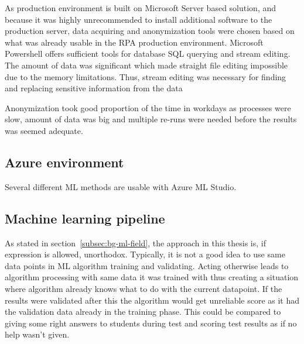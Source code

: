 As production environment is built on Microsoft Server based solution,
and because it was highly unrecommended
to install additional software to the production server,
data acquiring and anonymization tools were chosen
based on what was already usable in the RPA production environment.
Microsoft Powershell offers sufficient tools
for database SQL querying
and stream editing.
The amount of data was significant
which made straight file editing impossible
due to the memory limitations.
Thus, stream editing was necessary
for finding and replacing
sensitive information from the data


Anonymization took good proportion of the time in workdays
as processes were slow,
amount of data was big
and multiple re-runs were needed
before the results was seemed adequate.



\subsection{Azure environment}\label{subsec:meth-azure-environment}

Several different ML methods are usable with Azure ML Studio.%




\subsection{Machine learning pipeline}\label{subsec:meth-ml-pipeline}
As stated in section~\ref{subsec:bg-ml-field},
the approach in this thesis is,
if expression is allowed, unorthodox.
Typically,
it is not a good idea to use
same data points in ML algorithm training and validating.
Acting otherwise
leads to algorithm processing with
same data it was trained with
thus creating a situation
where algorithm already knows what to do with the current datapoint.
If the results were validated after this
the algorithm would get unreliable score
as it had the validation data already in the training phase.
This could be compared to
giving some right answers to students
during test and scoring test results as if
no help wasn't given.

